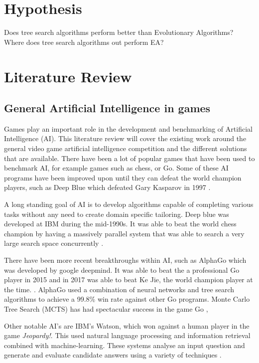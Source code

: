 \documentclass[journal]{IEEEtran}
\begin{document}
\section{Hypothesis}
Does tree search algorithms perform better than Evolutionary Algorithms?
Where does tree search algorithms out perform EA?

\section{Literature Review}

	\subsection{General Artificial Intelligence in games}
		Games play an important role in the development and benchmarking of Artificial Intelligence (AI). This literature review will cover the existing work around the general video game artificial intelligence competition and the different solutions that are available.
		There have been a lot of popular games that have been used to benchmark AI, for example games such as chess, or Go. Some of these AI programs have been improved upon until they can defeat the world champion players, such as Deep Blue which defeated Gary Kasparov in 1997 \cite{DeepBlue, shannon1988programming, DeepBlueOverview}. 
		
		A long standing goal of AI is to develop algorithms capable of completing various tasks without any need to create domain specific tailoring.
		Deep blue was developed at IBM during the mid-1990s. It was able to beat the world chess champion by having a massively parallel system that was able to search a very large search space concurrently \cite{DeepBlue}.

		There have been more recent breakthroughs within AI, such as AlphaGo \cite{silver2016mastering} which was developed by google deepmind. It was able to beat the a professional Go player in 2015 and in 2017 was able to beat Ke Jie, the world champion player at the time.
		\cite{silver2016mastering}. AlphaGo used a combination of neural networks and tree search algorithms to achieve a 99.8\% win rate against other Go programs.
		Monte Carlo Tree Search (MCTS) has had spectacular success in the game Go \cite{browne2012survey}, 

		Other notable AI's are IBM's Watson, which won against a human player in the game \textit{Jeopardy!}. This used natural language processing and information retrieval combined with machine-learning. These systems analyse an input question and generate and evaluate candidate answers using a variety of techniques \cite{ferrucci2013watson}.
\end{document}
